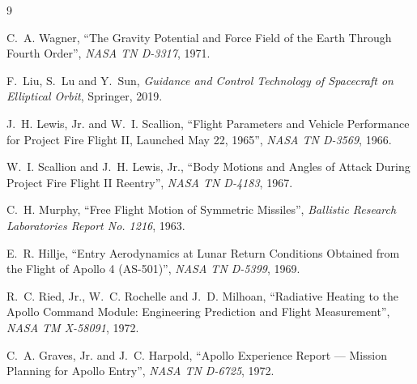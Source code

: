 \documentclass[11pt,a4paper,dvipdfmx]{jsarticle}
\begin{document}
\begin{thebibliography}{9}

C.~A. Wagner,
``The Gravity Potential and Force Field of the Earth Through Fourth Order'',
{\em NASA TN D-3317}, 1971.

F.~Liu, S.~Lu and Y.~Sun,
{\em Guidance and Control Technology of Spacecraft on Elliptical Orbit},
Springer, 2019.

J.~H. Lewis, Jr. and W.~I. Scallion,
``Flight Parameters and Vehicle Performance for Project Fire Flight II, Launched
May 22, 1965'',
{\em NASA TN D-3569}, 1966.

W.~I. Scallion and J.~H. Lewis, Jr.,
``Body Motions and Angles of Attack During Project Fire Flight II Reentry'',
{\em NASA TN D-4183}, 1967.

C.~H. Murphy,
``Free Flight Motion of Symmetric Missiles'',
{\em Ballistic Research Laboratories Report No. 1216}, 1963.

E.~R. Hillje,
``Entry Aerodynamics at Lunar Return Conditions Obtained from the Flight of Apollo 4
(AS-501)'',
{\em NASA TN D-5399}, 1969.

R.~C. Ried, Jr., W.~C. Rochelle and J.~D. Milhoan,
``Radiative Heating to the Apollo Command Module: Engineering Prediction and Flight
Measurement'',
{\em NASA TM X-58091}, 1972.

C.~A. Graves, Jr. and J.~C. Harpold,
``Apollo Experience Report --- Mission Planning for Apollo Entry'',
{\em NASA TN D-6725}, 1972.

\end{thebibliography}
\end{document}
